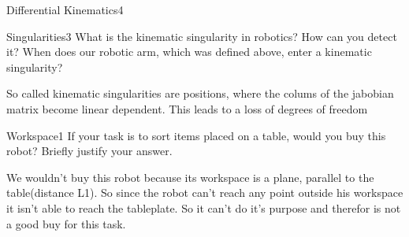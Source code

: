 \begin{questions}
\begin{question}{Differential Kinematics}{4}
\begin{answer}
\end{answer}

\end{question}


\begin{question}{Singularities}{3}
What is the kinematic singularity in robotics? How can you detect it? When does our robotic arm, which was defined above, enter a kinematic singularity?

\begin{answer}
So called kinematic singularities are positions, where the colums of the jabobian matrix become linear dependent. This leads to a loss of degrees of freedom %

\end{answer}

\end{question}


\begin{question}{Workspace}{1}
If your task is to sort items placed on a table, would you buy this robot? Briefly justify your answer.

\begin{answer}
We wouldn't buy this robot because its workspace is a plane, parallel to the table(distance L1). So since the robot can't reach any point outside his workspace it isn't able to reach the tableplate. So it can't do it's purpose and therefor is not a good buy for this task.
\end{answer}

\end{question}

\end{questions}
